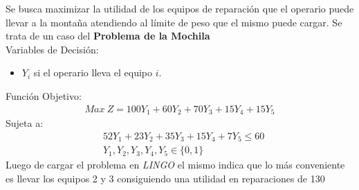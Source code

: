 

\begin{homeworkProblem}
Se busca maximizar la utilidad de los equipos de reparación que el operario puede llevar a la montaña atendiendo al límite de peso que el mismo puede cargar. Se trata de un caso del \textbf{Problema de la Mochila}\\
Variables de Decisión:
\begin{itemize}
    \item $Y_i$ si el operario lleva el equipo $i$.
\end{itemize}
Función Objetivo:
\begin{align*}
    Max\ Z = 100Y_1 + 60Y_2 + 70Y_3 + 15Y_4 + 15Y_5
\end{align*}
Sujeta a:
\begin{align*}
    &   52Y_1 + 23Y_2 + 35Y_3 + 15Y_4 +7Y_5 \leq 60\\
    &Y_1,Y_2,Y_3,Y_4,Y_5 \in \{0,1\}
\end{align*}
Luego de cargar el problema en \textit{LINGO} el mismo indica que lo más conveniente es llevar los equipos 2 y 3 consiguiendo una utilidad en reparaciones de 130
\end{homeworkProblem}



